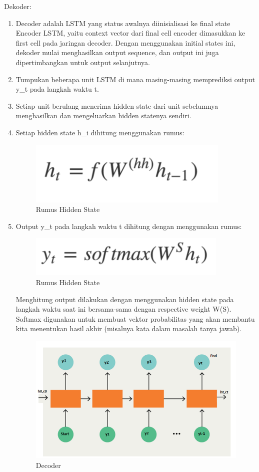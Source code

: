 Dekoder:
\begin{enumerate}
\item Decoder adalah LSTM yang status awalnya diinisialisasi ke final state Encoder LSTM, yaitu context vector dari final cell encoder dimasukkan ke first cell pada jaringan decoder. Dengan menggunakan initial states ini, dekoder mulai menghasilkan output sequence, dan output ini juga dipertimbangkan untuk output selanjutnya.
\item Tumpukan beberapa unit LSTM di mana masing-masing memprediksi output y\_t pada langkah waktu t.
\item Setiap unit berulang menerima hidden state dari unit sebelumnya menghasilkan dan mengeluarkan hidden statenya sendiri.
\item Setiap hidden state h\_i dihitung menggunakan rumus:
\begin{figure}[H]
        \centerline{\includegraphics[scale=.3]{figures/rumus-encoder}}
        \caption{Rumus Hidden State}
		\label{rumus1}
\end{figure}
\item Output y\_t pada langkah waktu t dihitung dengan menggunakan rumus:
\begin{figure}[H]
        \centerline{\includegraphics[scale=.3]{figures/rumus2}}
        \caption{Rumus Hidden State}
		\label{rumus2}
\end{figure}

Menghitung output dilakukan dengan menggunakan hidden state pada langkah waktu saat ini bersama-sama dengan respective weight W(S). Softmax digunakan untuk membuat vektor probabilitas yang akan membantu kita menentukan hasil akhir (misalnya kata dalam masalah tanya jawab).
\begin{figure}[H]
        \centerline{\includegraphics[scale=.45]{figures/lstm1}}
        \caption{Decoder}
		\label{decoder}
\end{figure}
\end{enumerate}


